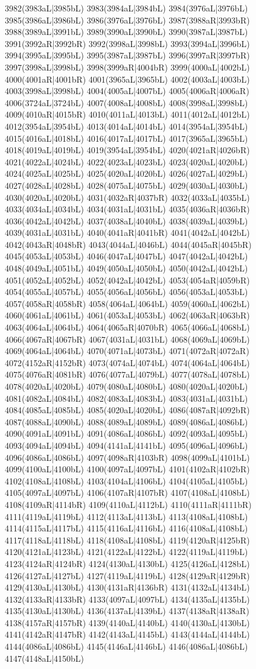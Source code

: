 3982(3983aL|3985bL) 3983(3984aL|3984bL) 3984(3976aL|3976bL) 3985(3986aL|3986bL) 3986(3976aL|3976bL) 3987(3988aR|3993bR) 3988(3989aL|3991bL) 3989(3990aL|3990bL) 3990(3987aL|3987bL) 3991(3992aR|3992bR) 3992(3998aL|3998bL) 3993(3994aL|3996bL) 3994(3995aL|3995bL) 3995(3987aL|3987bL) 3996(3997aR|3997bR) 3997(3998aL|3998bL) 3998(3999aR|4004bR) 3999(4000aL|4002bL) 4000(4001aR|4001bR) 4001(3965aL|3965bL) 4002(4003aL|4003bL) 4003(3998aL|3998bL) 4004(4005aL|4007bL) 4005(4006aR|4006aR) 4006(3724aL|3724bL) 4007(4008aL|4008bL) 4008(3998aL|3998bL) 4009(4010aR|4015bR) 4010(4011aL|4013bL) 4011(4012aL|4012bL) 4012(3954aL|3954bL) 4013(4014aL|4014bL) 4014(3954aL|3954bL) 4015(4016aL|4018bL) 4016(4017aL|4017bL) 4017(3965aL|3965bL) 4018(4019aL|4019bL) 4019(3954aL|3954bL) 4020(4021aR|4026bR) 4021(4022aL|4024bL) 4022(4023aL|4023bL) 4023(4020aL|4020bL) 4024(4025aL|4025bL) 4025(4020aL|4020bL) 4026(4027aL|4029bL) 4027(4028aL|4028bL) 4028(4075aL|4075bL) 4029(4030aL|4030bL) 4030(4020aL|4020bL) 4031(4032aR|4037bR) 4032(4033aL|4035bL) 4033(4034aL|4034bL) 4034(4031aL|4031bL) 4035(4036aR|4036bR) 4036(4042aL|4042bL) 4037(4038aL|4040bL) 4038(4039aL|4039bL) 4039(4031aL|4031bL) 4040(4041aR|4041bR) 4041(4042aL|4042bL) 4042(4043aR|4048bR) 4043(4044aL|4046bL) 4044(4045aR|4045bR) 4045(4053aL|4053bL) 4046(4047aL|4047bL) 4047(4042aL|4042bL) 4048(4049aL|4051bL) 4049(4050aL|4050bL) 4050(4042aL|4042bL) 4051(4052aL|4052bL) 4052(4042aL|4042bL) 4053(4054aR|4059bR) 4054(4055aL|4057bL) 4055(4056aL|4056bL) 4056(4053aL|4053bL) 4057(4058aR|4058bR) 4058(4064aL|4064bL) 4059(4060aL|4062bL) 4060(4061aL|4061bL) 4061(4053aL|4053bL) 4062(4063aR|4063bR) 4063(4064aL|4064bL) 4064(4065aR|4070bR) 4065(4066aL|4068bL) 4066(4067aR|4067bR) 4067(4031aL|4031bL) 4068(4069aL|4069bL) 4069(4064aL|4064bL) 4070(4071aL|4073bL) 4071(4072aR|4072aR) 4072(4152aR|4152bR) 4073(4074aL|4074bL) 4074(4064aL|4064bL) 4075(4076aR|4081bR) 4076(4077aL|4079bL) 4077(4078aL|4078bL) 4078(4020aL|4020bL) 4079(4080aL|4080bL) 4080(4020aL|4020bL) 4081(4082aL|4084bL) 4082(4083aL|4083bL) 4083(4031aL|4031bL) 4084(4085aL|4085bL) 4085(4020aL|4020bL) 4086(4087aR|4092bR) 4087(4088aL|4090bL) 4088(4089aL|4089bL) 4089(4086aL|4086bL) 4090(4091aL|4091bL) 4091(4086aL|4086bL) 4092(4093aL|4095bL) 4093(4094aL|4094bL) 4094(4141aL|4141bL) 4095(4096aL|4096bL) 4096(4086aL|4086bL) 4097(4098aR|4103bR) 4098(4099aL|4101bL) 4099(4100aL|4100bL) 4100(4097aL|4097bL) 4101(4102aR|4102bR) 4102(4108aL|4108bL) 4103(4104aL|4106bL) 4104(4105aL|4105bL) 4105(4097aL|4097bL) 4106(4107aR|4107bR) 4107(4108aL|4108bL) 4108(4109aR|4114bR) 4109(4110aL|4112bL) 4110(4111aR|4111bR) 4111(4119aL|4119bL) 4112(4113aL|4113bL) 4113(4108aL|4108bL) 4114(4115aL|4117bL) 4115(4116aL|4116bL) 4116(4108aL|4108bL) 4117(4118aL|4118bL) 4118(4108aL|4108bL) 4119(4120aR|4125bR) 4120(4121aL|4123bL) 4121(4122aL|4122bL) 4122(4119aL|4119bL) 4123(4124aR|4124bR) 4124(4130aL|4130bL) 4125(4126aL|4128bL) 4126(4127aL|4127bL) 4127(4119aL|4119bL) 4128(4129aR|4129bR) 4129(4130aL|4130bL) 4130(4131aR|4136bR) 4131(4132aL|4134bL) 4132(4133aR|4133bR) 4133(4097aL|4097bL) 4134(4135aL|4135bL) 4135(4130aL|4130bL) 4136(4137aL|4139bL) 4137(4138aR|4138aR) 4138(4157aR|4157bR) 4139(4140aL|4140bL) 4140(4130aL|4130bL) 4141(4142aR|4147bR) 4142(4143aL|4145bL) 4143(4144aL|4144bL) 4144(4086aL|4086bL) 4145(4146aL|4146bL) 4146(4086aL|4086bL) 4147(4148aL|4150bL) 